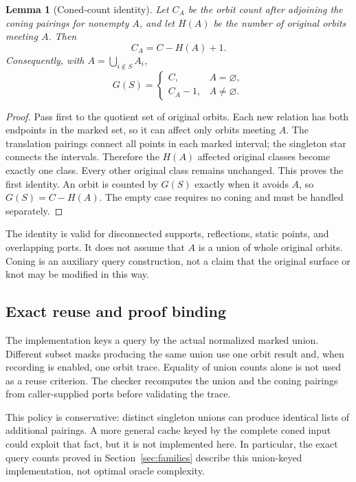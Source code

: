 \documentclass[11pt,letterpaper]{article}
\newtheorem{lemma}[theorem]{Lemma}
\theoremstyle{definition}
\begin{document}
\begin{lemma}[Coned-count identity]\label{lem:cone}
Let $C_A$ be the orbit count after adjoining the coning pairings for nonempty
$A$, and let $H(A)$ be the number of original orbits meeting $A$. Then
\[
 C_A=C-H(A)+1.
\]
Consequently, with $A=\bigcup_{i\notin S}A_i$,
\begin{equation}\label{eq:cone-zeta}
 G(S)=
 \begin{cases}
 C,&A=\varnothing,\\
 C_A-1,&A\ne\varnothing.
 \end{cases}
\end{equation}
\end{lemma}
\begin{proof}
Pass first to the quotient set of original orbits. Each new relation has
both endpoints in the marked set, so it can affect only orbits meeting $A$.
The translation pairings connect all points in each marked interval; the
singleton star connects the intervals. Therefore the $H(A)$ affected
original classes become exactly one class. Every other original class
remains unchanged. This proves the first identity. An orbit is counted by
$G(S)$ exactly when it avoids $A$, so $G(S)=C-H(A)$. The empty case requires
no coning and must be handled separately.
\end{proof}

The identity is valid for disconnected supports, reflections, static points,
and overlapping ports. It does not assume that $A$ is a union of whole
original orbits. Coning is an auxiliary query construction, not a claim
that the original surface or knot may be modified in this way.

\subsection{Exact reuse and proof binding}
The implementation keys a query by the actual normalized marked union.
Different subset masks producing the same union use one orbit result and,
when recording is enabled, one orbit trace. Equality of union counts alone
is not used as a reuse criterion. The checker recomputes the union and the
coning pairings from caller-supplied ports before validating the trace.

This policy is conservative: distinct singleton unions can produce identical
lists of additional pairings. A more general cache keyed by the complete
coned input could exploit that fact, but it is not implemented here. In
particular, the exact query counts proved in Section~\ref{sec:families}
describe this union-keyed implementation, not optimal oracle complexity.
\end{document}
